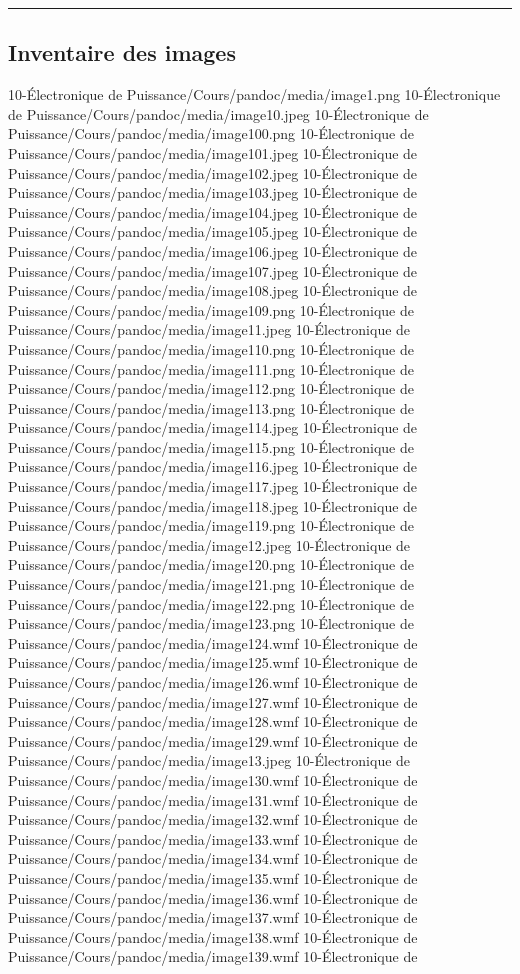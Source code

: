 \begin{center}\rule{0.5\linewidth}{0.5pt}\end{center}

\hypertarget{inventaire-des-images}{%
\subsection{Inventaire des images}\label{inventaire-des-images}}

10-Électronique de Puissance/Cours/pandoc/media/image1.png 10-Électronique de Puissance/Cours/pandoc/media/image10.jpeg 10-Électronique de Puissance/Cours/pandoc/media/image100.png 10-Électronique de Puissance/Cours/pandoc/media/image101.jpeg 10-Électronique de Puissance/Cours/pandoc/media/image102.jpeg 10-Électronique de Puissance/Cours/pandoc/media/image103.jpeg 10-Électronique de Puissance/Cours/pandoc/media/image104.jpeg 10-Électronique de Puissance/Cours/pandoc/media/image105.jpeg 10-Électronique de Puissance/Cours/pandoc/media/image106.jpeg 10-Électronique de Puissance/Cours/pandoc/media/image107.jpeg 10-Électronique de Puissance/Cours/pandoc/media/image108.jpeg 10-Électronique de Puissance/Cours/pandoc/media/image109.png 10-Électronique de Puissance/Cours/pandoc/media/image11.jpeg 10-Électronique de Puissance/Cours/pandoc/media/image110.png 10-Électronique de Puissance/Cours/pandoc/media/image111.png 10-Électronique de Puissance/Cours/pandoc/media/image112.png 10-Électronique de Puissance/Cours/pandoc/media/image113.png 10-Électronique de Puissance/Cours/pandoc/media/image114.jpeg 10-Électronique de Puissance/Cours/pandoc/media/image115.png 10-Électronique de Puissance/Cours/pandoc/media/image116.jpeg 10-Électronique de Puissance/Cours/pandoc/media/image117.jpeg 10-Électronique de Puissance/Cours/pandoc/media/image118.jpeg 10-Électronique de Puissance/Cours/pandoc/media/image119.png 10-Électronique de Puissance/Cours/pandoc/media/image12.jpeg 10-Électronique de Puissance/Cours/pandoc/media/image120.png 10-Électronique de Puissance/Cours/pandoc/media/image121.png 10-Électronique de Puissance/Cours/pandoc/media/image122.png 10-Électronique de Puissance/Cours/pandoc/media/image123.png 10-Électronique de Puissance/Cours/pandoc/media/image124.wmf 10-Électronique de Puissance/Cours/pandoc/media/image125.wmf 10-Électronique de Puissance/Cours/pandoc/media/image126.wmf 10-Électronique de Puissance/Cours/pandoc/media/image127.wmf 10-Électronique de Puissance/Cours/pandoc/media/image128.wmf 10-Électronique de Puissance/Cours/pandoc/media/image129.wmf 10-Électronique de Puissance/Cours/pandoc/media/image13.jpeg 10-Électronique de Puissance/Cours/pandoc/media/image130.wmf 10-Électronique de Puissance/Cours/pandoc/media/image131.wmf 10-Électronique de Puissance/Cours/pandoc/media/image132.wmf 10-Électronique de Puissance/Cours/pandoc/media/image133.wmf 10-Électronique de Puissance/Cours/pandoc/media/image134.wmf 10-Électronique de Puissance/Cours/pandoc/media/image135.wmf 10-Électronique de Puissance/Cours/pandoc/media/image136.wmf 10-Électronique de Puissance/Cours/pandoc/media/image137.wmf 10-Électronique de Puissance/Cours/pandoc/media/image138.wmf 10-Électronique de Puissance/Cours/pandoc/media/image139.wmf 10-Électronique de 